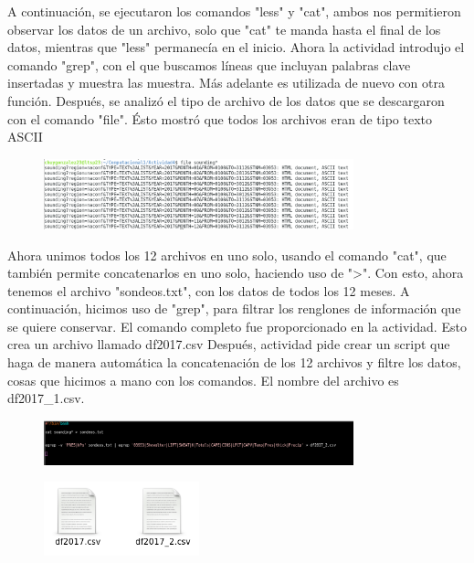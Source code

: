 \documentclass[a4paper]{article}
\begin{document}
A continuación, se ejecutaron los comandos "less" y "cat", ambos nos permitieron observar los datos de un archivo, solo que "cat" te manda hasta el final de los datos, mientras que "less" permanecía en el inicio. Ahora la actividad introdujo el comando "grep", con el que buscamos líneas que incluyan palabras clave insertadas y muestra las muestra. Más adelante es utilizada de nuevo con otra función. Después, se analizó el tipo de archivo de los datos que se descargaron con el comando "file". Ésto mostró que todos los archivos eran de tipo texto ASCII

\begin{figure}[ht!]
 \centering
  \includegraphics[width=0.8\textwidth]{PAct3.png}
\end{figure}

Ahora unimos todos los 12 archivos en uno solo, usando el comando "cat", que también permite concatenarlos en uno solo, haciendo uso de ">". Con esto, ahora tenemos el archivo "sondeos.txt", con los datos de todos los 12 meses. A continuación, hicimos uso de "grep", para filtrar los renglones de información que se quiere conservar. El comando completo fue proporcionado en la actividad. Esto crea un archivo llamado df2017.csv Después, actividad pide crear un script que haga de manera automática la concatenación de los 12 archivos y filtre los datos, cosas que hicimos a mano con los comandos. El nombre del archivo es df2017\_1.csv. 

\begin{figure}[h!]
 \centering
  \includegraphics[width=0.8\textwidth]{PAct4.png}
\end{figure}
\begin{figure}[h!]
 \centering
  \includegraphics[width=0.4\textwidth]{PAct5.png}
\end{figure}
\end{document}
